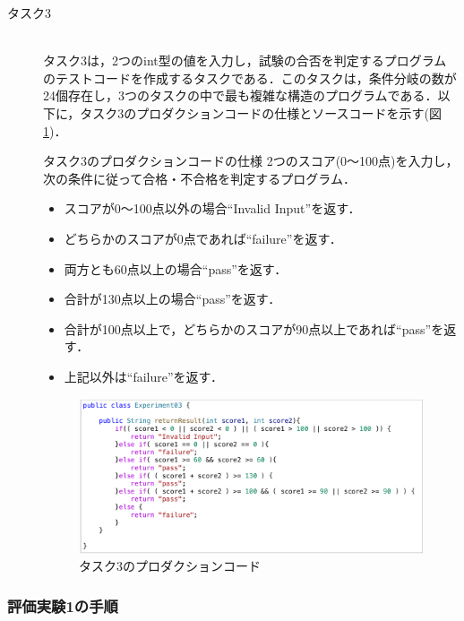 \documentclass[12pt]{jarticle} %
\begin{document}
\begin{description}
\item[タスク3]~\\
タスク3は，2つのint型の値を入力し，試験の合否を判定するプログラムのテストコードを作成するタスクである．このタスクは，条件分岐の数が24個存在し，3つのタスクの中で最も複雑な構造のプログラムである．以下に，タスク3のプロダクションコードの仕様とソースコードを示す(図\ref{E3})．

\begin{itembox}[l]{タスク3のプロダクションコードの仕様}
2つのスコア(0～100点)を入力し，次の条件に従って合格・不合格を判定するプログラム．
\begin{itemize}
\item スコアが0～100点以外の場合``Invalid Input''を返す．
\item どちらかのスコアが0点であれば``failure''を返す．
\item 両方とも60点以上の場合``pass''を返す．
\item 合計が130点以上の場合``pass''を返す．
\item 合計が100点以上で，どちらかのスコアが90点以上であれば``pass''を返す．
\item 上記以外は``failure''を返す．
\end{itemize}
\end{itembox}


\begin{figure}[htbp]
\begin{center}
\includegraphics[clip,width=15cm]{E3.pdf}
\caption{タスク3のプロダクションコード}
\label{E3}
\end{center}
\end{figure}

\end{description}

\subsubsection{評価実験1の手順}
\end{document}
